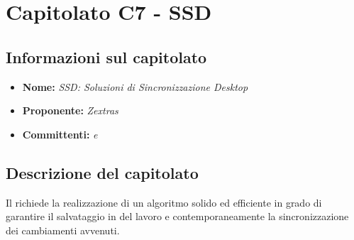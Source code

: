 \section{Capitolato C7 - SSD}\label{C7}
\subsection{Informazioni sul capitolato}
\begin{itemize}
	\item \textbf{Nome:} \textit{SSD: Soluzioni di Sincronizzazione Desktop}
	\item \textbf{Proponente:} \textit{Zextras}
	\item \textbf{Committenti:} \textit{\VT{} e \CR{}}
\end{itemize}

\subsection{Descrizione del capitolato}
Il  richiede la realizzazione di un algoritmo solido ed efficiente in grado di garantire il salvataggio in  del lavoro e contemporaneamente la sincronizzazione dei cambiamenti avvenuti.


